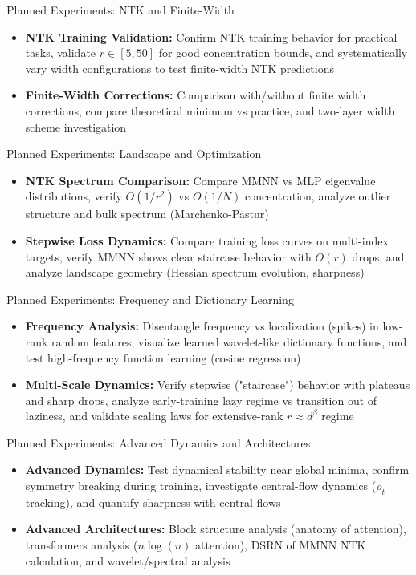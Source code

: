 \documentclass[aspectratio=169]{beamer}
\begin{document}
\begin{frame}{Planned Experiments: NTK and Finite-Width}
\begin{itemize}
\item \textbf{NTK Training Validation:} Confirm NTK training behavior for practical tasks, validate $r \in [5,50]$ for good concentration bounds, and systematically vary width configurations to test finite-width NTK predictions
\item \textbf{Finite-Width Corrections:} Comparison with/without finite width corrections, compare theoretical minimum vs practice, and two-layer width scheme investigation
\end{itemize}
\end{frame}

\begin{frame}{Planned Experiments: Landscape and Optimization}
\begin{itemize}
\item \textbf{NTK Spectrum Comparison:} Compare MMNN vs MLP eigenvalue distributions, verify $O(1/r^2)$ vs $O(1/N)$ concentration, analyze outlier structure and bulk spectrum (Marchenko-Pastur)
\item \textbf{Stepwise Loss Dynamics:} Compare training loss curves on multi-index targets, verify MMNN shows clear staircase behavior with $O(r)$ drops, and analyze landscape geometry (Hessian spectrum evolution, sharpness)
\end{itemize}
\end{frame}

\begin{frame}{Planned Experiments: Frequency and Dictionary Learning}
\begin{itemize}
\item \textbf{Frequency Analysis:} Disentangle frequency vs localization (spikes) in low-rank random features, visualize learned wavelet-like dictionary functions, and test high-frequency function learning (cosine regression)
\item \textbf{Multi-Scale Dynamics:} Verify stepwise ("staircase") behavior with plateaus and sharp drops, analyze early-training lazy regime vs transition out of laziness, and validate scaling laws for extensive-rank $r \approx d^\beta$ regime
\end{itemize}
\end{frame}

\begin{frame}{Planned Experiments: Advanced Dynamics and Architectures}
\begin{itemize}
\item \textbf{Advanced Dynamics:} Test dynamical stability near global minima, confirm symmetry breaking during training, investigate central-flow dynamics ($\rho_t$ tracking), and quantify sharpness with central flows
\item \textbf{Advanced Architectures:} Block structure analysis (anatomy of attention), transformers analysis ($n\log(n)$ attention), DSRN of MMNN NTK calculation, and wavelet/spectral analysis
\end{itemize}
\end{frame}
\end{document}

